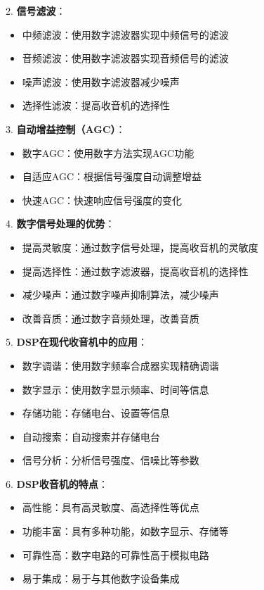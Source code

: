 \documentclass[12pt,UTF8]{ctexbook}
\begin{document}
2. \textbf{信号滤波}：
   \begin{itemize}[leftmargin=3.5em]
   \item 中频滤波：使用数字滤波器实现中频信号的滤波
   \item 音频滤波：使用数字滤波器实现音频信号的滤波
   \item 噪声滤波：使用数字滤波器减少噪声
   \item 选择性滤波：提高收音机的选择性
   \end{itemize}

3. \textbf{自动增益控制（AGC）}：
   \begin{itemize}[leftmargin=3.5em]
   \item 数字AGC：使用数字方法实现AGC功能
   \item 自适应AGC：根据信号强度自动调整增益
   \item 快速AGC：快速响应信号强度的变化
   \end{itemize}

4. \textbf{数字信号处理的优势}：
   \begin{itemize}[leftmargin=3.5em]
   \item 提高灵敏度：通过数字信号处理，提高收音机的灵敏度
   \item 提高选择性：通过数字滤波器，提高收音机的选择性
   \item 减少噪声：通过数字噪声抑制算法，减少噪声
   \item 改善音质：通过数字音频处理，改善音质
   \end{itemize}

5. \textbf{DSP在现代收音机中的应用}：
   \begin{itemize}[leftmargin=3.5em]
   \item 数字调谐：使用数字频率合成器实现精确调谐
   \item 数字显示：使用数字显示频率、时间等信息
   \item 存储功能：存储电台、设置等信息
   \item 自动搜索：自动搜索并存储电台
   \item 信号分析：分析信号强度、信噪比等参数
   \end{itemize}

6. \textbf{DSP收音机的特点}：
   \begin{itemize}[leftmargin=3.5em]
   \item 高性能：具有高灵敏度、高选择性等优点
   \item 功能丰富：具有多种功能，如数字显示、存储等
   \item 可靠性高：数字电路的可靠性高于模拟电路
   \item 易于集成：易于与其他数字设备集成
   \end{itemize}
\end{document}
